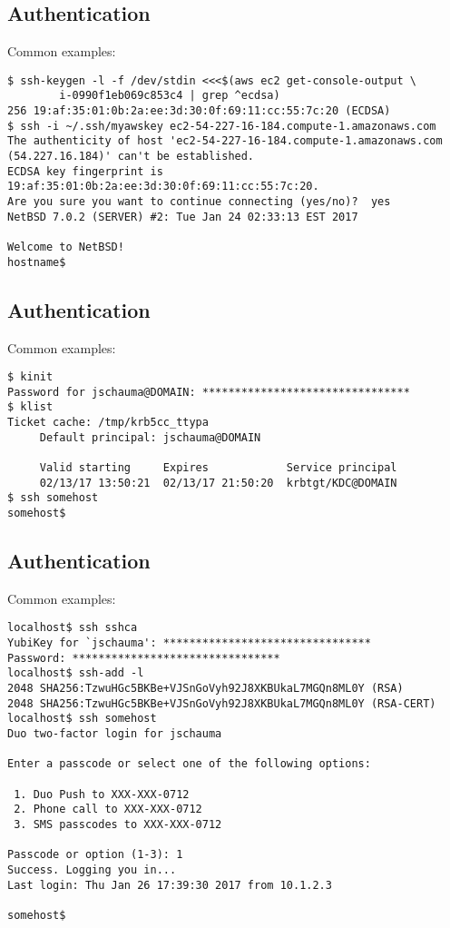 \documentclass[xga]{xdvislides}
\newcommand{\smallish}{\fontsize{16}{16}\selectfont}
\begin{document}
\subsection{Authentication}
Common examples:

\begin{verbatim}
$ ssh-keygen -l -f /dev/stdin <<<$(aws ec2 get-console-output \
        i-0990f1eb069c853c4 | grep ^ecdsa)
256 19:af:35:01:0b:2a:ee:3d:30:0f:69:11:cc:55:7c:20 (ECDSA)
$ ssh -i ~/.ssh/myawskey ec2-54-227-16-184.compute-1.amazonaws.com
The authenticity of host 'ec2-54-227-16-184.compute-1.amazonaws.com
(54.227.16.184)' can't be established.
ECDSA key fingerprint is 19:af:35:01:0b:2a:ee:3d:30:0f:69:11:cc:55:7c:20.
Are you sure you want to continue connecting (yes/no)?  yes
NetBSD 7.0.2 (SERVER) #2: Tue Jan 24 02:33:13 EST 2017

Welcome to NetBSD!
hostname$ 
\end{verbatim}

\subsection{Authentication}
Common examples:

\begin{verbatim}
$ kinit
Password for jschauma@DOMAIN: ********************************
$ klist
Ticket cache: /tmp/krb5cc_ttypa
     Default principal: jschauma@DOMAIN
     
     Valid starting     Expires            Service principal
     02/13/17 13:50:21  02/13/17 21:50:20  krbtgt/KDC@DOMAIN
$ ssh somehost
somehost$ 
\end{verbatim}

\subsection{Authentication}
Common examples:

\smallish
\begin{verbatim}
localhost$ ssh sshca
YubiKey for `jschauma': ********************************
Password: ********************************
localhost$ ssh-add -l
2048 SHA256:TzwuHGc5BKBe+VJSnGoVyh92J8XKBUkaL7MGQn8ML0Y (RSA)
2048 SHA256:TzwuHGc5BKBe+VJSnGoVyh92J8XKBUkaL7MGQn8ML0Y (RSA-CERT)
localhost$ ssh somehost
Duo two-factor login for jschauma

Enter a passcode or select one of the following options:

 1. Duo Push to XXX-XXX-0712
 2. Phone call to XXX-XXX-0712
 3. SMS passcodes to XXX-XXX-0712

Passcode or option (1-3): 1
Success. Logging you in...
Last login: Thu Jan 26 17:39:30 2017 from 10.1.2.3

somehost$ 
\end{verbatim}
\Normalsize
\end{document}

